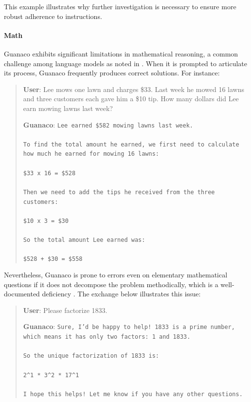 This example illustrates why further investigation is necessary to ensure more robust adherence to instructions.

\paragraph{Math} {Guanaco} exhibits significant limitations in mathematical reasoning, a common challenge among language models as noted in \citep{liang2022holistic}. When it is prompted to articulate its process, {Guanaco} frequently produces correct solutions. For instance:

\begin{quote}
    \textbf{User}: Lee mows one lawn and charges \$33. Last week he mowed 16 lawns and three customers each gave him a \$10 tip. How many dollars did Lee earn mowing lawns last week?

    \textbf{Guanaco}: \texttt{Lee earned \$582 mowing lawns last week. \\ \\ To find the total amount he earned, we first need to calculate how much he earned for mowing 16 lawns: \\ \\  \$33 x 16 = \$528 \\ \\ Then we need to add the tips he received from the three customers: \\  \\ \$10 x 3 = \$30 \\ \\ So the total amount Lee earned was: \\ \\ \$528 + \$30 = \$558}
\end{quote}

Nevertheless, {Guanaco} is prone to errors even on elementary mathematical questions if it does not decompose the problem methodically, which is a well-documented deficiency \cite{weichain}. The exchange below illustrates this issue:

\begin{quote}
    \textbf{User}: Please factorize 1833.

    \textbf{Guanaco}: \texttt{Sure, I'd be happy to help! 1833 is a prime number, which means it has only two factors: 1 and 1833. \\ \\ So the unique factorization of 1833 is: \\ \\ 2\^{}1 * 3\^{}2 * 17\^{}1 \\ \\ I hope this helps! Let me know if you have any other questions.}
\end{quote}

